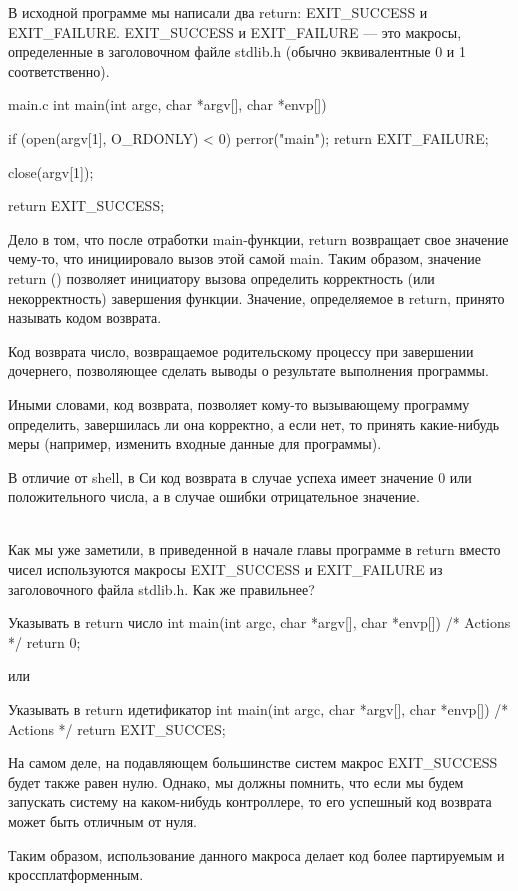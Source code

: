В исходной программе мы написали два return: EXIT\_SUCCESS и EXIT\_FAILURE. EXIT\_SUCCESS и EXIT\_FAILURE --- это макросы, определенные в заголовочном файле stdlib.h (обычно эквивалентные 0 и 1 соответственно).

\begin{CCode}{main.c}
int main(int argc, char *argv[], char *envp[]) { 
	if (open(argv[1], O_RDONLY) < 0) {
		perror("main");			
		return EXIT_FAILURE;
	}	 
				
 	close(argv[1]);
 				
 	return EXIT_SUCCESS;
} \end{CCode}

Дело в том, что после отработки main-функции, return возвращает свое значение чему-то, что инициировало вызов этой самой main. Таким образом, значение return () позволяет инициатору вызова определить корректность (или некорректность) завершения функции. Значение, определяемое в return, принято называть кодом возврата.

\begin{defi}{Код возврата}
	число, возвращаемое родительскому процессу при завершении дочернего, позволяющее сделать выводы о результате выполнения программы.
\end{defi}

Иными словами, код возврата, позволяет кому-то вызывающему программу определить, завершилась ли она корректно, а если нет, то принять какие-нибудь меры (например, изменить входные данные для программы).

\begin{important}
	В отличие от shell, в Си код возврата в случае успеха имеет значение 0 или положительного числа, а в случае ошибки отрицательное значение.
\end{important}

~\\
Как мы уже заметили, в приведенной в начале главы программе в return вместо чисел используются макросы EXIT\_SUCCESS и EXIT\_FAILURE из заголовочного файла stdlib.h. Как же правильнее?
	
\begin{CCode}{Указывать в return число}
	int main(int argc, char *argv[], char *envp[]) { 
			/* Actions */
			return 0; 
	} \end{CCode}

или

\begin{CCode}{Указывать в return идетификатор}
	int main(int argc, char *argv[], char *envp[]) { 
			/* Actions */
			return EXIT_SUCCES; 
	} \end{CCode}
		
На самом деле, на подавляющем большинстве систем макрос EXIT\_SUCCESS будет также равен нулю. Однако, мы должны помнить, что если мы будем запускать систему на каком-нибудь контроллере, то его успешный код возврата может быть отличным от нуля.

Таким образом, использование данного макроса делает код более партируемым и кроссплатформенным.

